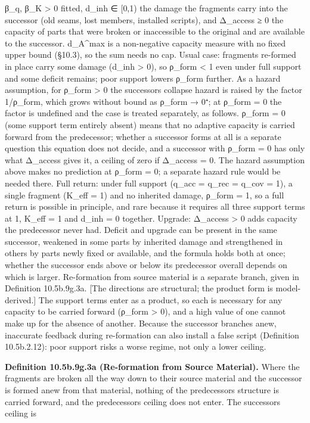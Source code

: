\documentclass[
]{article}
\begin{document}
β\_q, β\_K \textgreater{} 0 fitted, d\_inh ∈ {[}0,1) the damage the
fragments carry into the successor (old seams, lost members, installed
scripts), and Δ\_access ≥ 0 the capacity of parts that were broken or
inaccessible to the original and are available to the successor.
d\_A\^{}max is a non-negative capacity measure with no fixed upper bound
(§10.3), so the sum needs no cap. Usual case: fragments re-formed in
place carry some damage (d\_inh \textgreater{} 0), so ρ\_form
\textless{} 1 even under full support and some deficit remains; poor
support lowers ρ\_form further. As a hazard assumption, for ρ\_form
\textgreater{} 0 the successor\textquotesingle s collapse hazard is
raised by the factor 1/ρ\_form, which grows without bound as ρ\_form →
0⁺; at ρ\_form = 0 the factor is undefined and the case is treated
separately, as follows. ρ\_form = 0 (some support term entirely absent)
means that no adaptive capacity is carried forward from the predecessor;
whether a successor forms at all is a separate question this equation
does not decide, and a successor with ρ\_form = 0 has only what
Δ\_access gives it, a ceiling of zero if Δ\_access = 0. The hazard
assumption above makes no prediction at ρ\_form = 0; a separate hazard
rule would be needed there. Full return: under full support (q\_acc =
q\_rec = q\_cov = 1), a single fragment (K\_eff = 1) and no inherited
damage, ρ\_form = 1, so a full return is possible in principle, and rare
because it requires all three support terms at 1, K\_eff = 1 and d\_inh
= 0 together. Upgrade: Δ\_access \textgreater{} 0 adds capacity the
predecessor never had. Deficit and upgrade can be present in the same
successor, weakened in some parts by inherited damage and strengthened
in others by parts newly fixed or available, and the formula holds both
at once; whether the successor ends above or below its predecessor
overall depends on which is larger. Re-formation from source material is
a separate branch, given in Definition 10.5b.9g.3a. {[}The directions
are structural; the product form is model-derived.{]} The support terms
enter as a product, so each is necessary for any capacity to be carried
forward (ρ\_form \textgreater{} 0), and a high value of one cannot make
up for the absence of another. Because the successor branches anew,
inaccurate feedback during re-formation can also install a false script
(Definition 10.5b.2.12): poor support risks a worse regime, not only a
lower ceiling.

\textbf{Definition 10.5b.9g.3a (Re-formation from Source Material).}
Where the fragments are broken all the way down to their source material
and the successor is formed anew from that material, nothing of the
predecessor\textquotesingle s structure is carried forward, and the
predecessor\textquotesingle s ceiling does not enter. The
successor\textquotesingle s ceiling is
\end{document}
